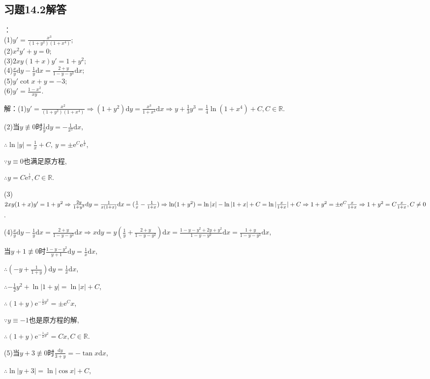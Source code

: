 \documentclass[12pt,UTF8]{ctexart}
\newcommand{\me}[0]{\mathrm e}
\begin{document}
\subsection{习题14.2解答}
\begin{enumerate}
：\\
(1)$y'=\frac{x^3}{(1+y^2)(1+x^4)}$;\\
(2)$x^2y'+y=0$;\\
(3)$2xy(1+x)y'=1+y^2$;\\
(4)$\frac xy\mathrm dy-\frac1y\mathrm dx=\frac{2+y}{1-y-y^2}\mathrm dx$;\\
(5)$y'\cot x+y=-3$;\\
(6)$y'=\frac{1-x^2}{xy}$.

解：(1)$y'=\frac{x^2}{(1+y^2)(1+x^4)}\Rightarrow(1+y^2)\mathrm dy=\frac{x^3}{1+x^4}\mathrm dx\Rightarrow y+\frac13y^3=\frac14\ln(1+x^4)+C,C\in\mathbb R$.

(2)当$y\not\equiv0$时$\frac1y\mathrm dy=-\frac1{x^2}\mathrm dx$,

$\therefore\ln|y|=\frac1x+C,\ y=\pm\me^C\me^{\frac1x}$,

$\because y\equiv0$也满足原方程,

$\therefore y=C\me^{\frac1x},C\in\mathbb R$.

(3)$2xy(1+x)y'=1+y^2\Rightarrow\frac{2y}{1+y^2}\mathrm dy=\frac1{x(1+x)}\mathrm dx=(\frac1x-\frac1{1+x})\\ 
\Rightarrow\ln(1+y^2)=\ln|x|-\ln|1+x|+C=\ln|\frac x{1+x}|+C\Rightarrow1+y^2=\pm\me^C\frac x{1+x}\\
\Rightarrow1+y^2=C\frac x{1+x},C\neq0$.

(4)$\frac xy\mathrm dy-\frac1y\mathrm dx=\frac{2+y}{1-y-y^2}\mathrm dx\Rightarrow x\mathrm dy=y(\frac1y+\frac{2+y}{1-y-y^2})\mathrm dx=\frac{1-y-y^2+2y+y^2}{1-y-y^2}\mathrm dx=\frac{1+y}{1-y-y^2}\mathrm dx$,

当$y+1\not\equiv0$时$\frac{1-y-y^2}{y+1}\mathrm dy=\frac1x\mathrm dx$,

$\therefore(-y+\frac1{1+y})\mathrm dy=\frac1x\mathrm dx$,

$\therefore -\frac12y^2+\ln|1+y|=\ln|x|+C$,

$\therefore (1+y)\me^{-\frac12y^2}=\pm\me^Cx$,

$\because y\equiv-1$也是原方程的解,

$\therefore(1+y)\me^{-\frac12y^2}=Cx,C\in\mathbb R$.

(5)当$y+3\not\equiv0$时$\frac{\mathrm dy}{3+y}=-\tan x\mathrm dx$,

$\therefore\ln|y+3|=\ln|\cos x|+C$,


\end{enumerate}
\end{document}

